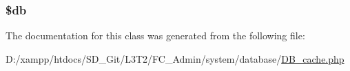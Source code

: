 \subsubsection[{\$db}]{\setlength{\rightskip}{0pt plus 5cm}\$db}\label{class_c_i___d_b___cache_a1fa3127fc82f96b1436d871ef02be319}


The documentation for this class was generated from the following file\+:\begin{DoxyCompactItemize}
\item 
D\+:/xampp/htdocs/\+S\+D\+\_\+\+Git/\+L3\+T2/\+F\+C\+\_\+\+Admin/system/database/\hyperlink{_d_b__cache_8php}{D\+B\+\_\+cache.\+php}\end{DoxyCompactItemize}
